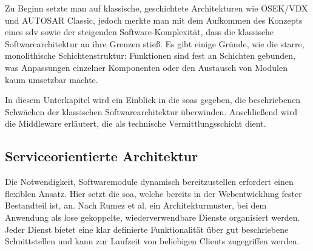 Zu Beginn setzte man auf klassische, geschichtete Architekturen wie OSEK/VDX und AUTOSAR Classic, jedoch merkte man mit dem Aufkommen des Konzepts eines \gls{sdv} sowie der steigenden Software-Komplexität, dass die klassische Softwarearchitektur an ihre Grenzen stieß. Es gibt einige Gründe, wie die starre, monolithische Schichtenstruktur: Funktionen sind fest an Schichten gebunden, was Anpassungen einzelner Komponenten oder den Austausch von Modulen kaum umsetzbar machte.

In diesem Unterkapitel wird ein Einblick in die \glspl{soa} gegeben, die beschriebenen Schwächen der klassischen Softwarearchitektur überwinden. Anschließend wird die Middleware erläutert, die als technische Vermittlungsschicht dient.

\subsection{Serviceorientierte Architektur}
\label{subsect:soa}
Die Notwendigkeit, Softwaremodule dynamisch bereitzustellen erfordert einen flexiblen Ansatz. Hier setzt die \gls{soa}, welche bereits in der Webentwicklung fester Bestandteil ist, an. Nach Rumez et al.\cite{rumezOverviewAutomotiveServiceOriented2020} ein Architekturmuster, bei dem Anwendung als lose gekoppelte, wiederverwendbare Dienste organisiert werden. Jeder Dienst bietet eine klar definierte Funktionalität über gut beschriebene Schnittstellen und kann zur Laufzeit von beliebigen Clients zugegriffen werden.

